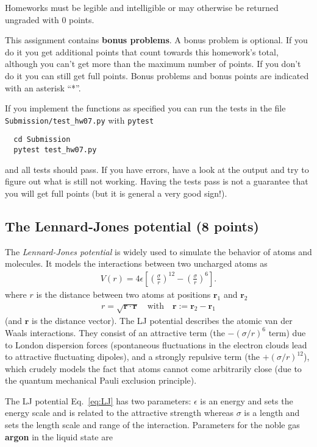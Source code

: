 \documentclass[paper=letter]{scrartcl}
\newcommand{\anumber}{7}
\renewcommand{\vec}[1]{\ensuremath{\mathbf{#1}}}
\newcommand{\anum}{0\anumber}
\begin{document}
Homeworks must be legible and intelligible or may otherwise be
returned ungraded with 0 points.

This assignment contains \textbf{bonus problems}. A bonus problem is
optional. If you do it you get additional points that count towards
this homework's total, although you can't get more than the maximum
number of points. If you don't do it you can still get full
points. Bonus problems and bonus points are indicated with an asterisk
``*''.

If you implement the functions as specified you can run the tests in
the file \texttt{Submission/test\_hw\anum.py} with \texttt{pytest}
\begin{verbatim}
  cd Submission
  pytest test_hw07.py
\end{verbatim}
and all tests should pass. If you have errors, have a look at the
output and try to figure out what is still not working. Having the
tests pass is not a guarantee that you will get full points (but it is
general a very good sign!). 

\subsection{The Lennard-Jones potential (8 points)}
\label{sec:LJ}

The \emph{Lennard-Jones potential} is widely used to simulate the
behavior of atoms and molecules. It models the interactions between
two uncharged atoms as
\begin{gather}
  \label{eq:LJ}
  V(r) = 4\epsilon\left[\left(\frac{\sigma}{r}\right)^{12} - \left(\frac{\sigma}{r}\right)^{6}\right].
\end{gather}
where $r$ is the distance between two atoms at positions $\vec{r}_{1}$
and $\vec{r}_{2}$
\begin{gather}
  \label{eq:distance}
  r = \sqrt{\vec{r}\cdot\vec{r}} \quad\text{with}\quad \vec{r} :=
  \vec{r}_{2} - \vec{r}_{1}
\end{gather}
(and $\vec{r}$ is the distance vector).  The LJ potential describes
the atomic van der Waals interactions. They consist of an attractive
term (the $-(\sigma/r)^{6}$ term) due to London dispersion forces
(spontaneous fluctuations in the electron clouds lead to attractive
fluctuating dipoles), and a strongly repulsive term (the
$+(\sigma/r)^{12}$), which crudely models the fact that atoms cannot
come arbitrarily close (due to the quantum mechanical Pauli exclusion
principle).

The LJ potential Eq.~\ref{eq:LJ} has two parameters: $\epsilon$ is an
energy and sets the energy scale and is related to the attractive
strength whereas $\sigma$ is a length and sets the length scale and
range of the interaction. Parameters for the noble gas \textbf{argon}
in the liquid state are
\end{document}
